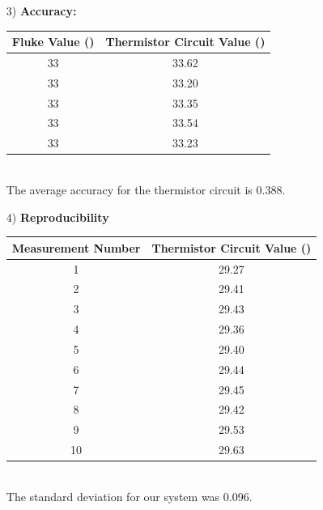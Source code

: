 \documentclass{article}
\begin{document}
\begin{enumerate}
		\item[3)] %
			\textbf{Accuracy: }\\[-2.5ex]
			\begin{table}[h]
				\centering
				\begin{tabular}{|c|c|}\hline
					Fluke Value (\celsius)	&	Thermistor Circuit Value (\celsius)\\ \hline
					33	&	33.62\\ \hline
					33	&	33.20\\ \hline
					33	&	33.35\\ \hline
					33	&	33.54\\ \hline
					33	&	33.23\\ \hline
				\end{tabular}
			\end{table} \\[-1ex]
			The average accuracy for the thermistor circuit is 0.388\celsius.
			
		\item[4)]
			\textbf{Reproducibility}\\[-1ex] %
			\begin{table}[h]
				\centering
				\begin{tabular}{|c|c|}\hline
					Measurement Number	&	Thermistor Circuit Value (\celsius)\\ \hline
					1	&	29.27\\ \hline
					2	&	29.41\\ \hline
					3	&	29.43\\ \hline
					4	&	29.36\\ \hline
					5	&	29.40\\ \hline
					6	&	29.44\\ \hline
					7	&	29.45\\ \hline
					8	&	29.42\\ \hline
					9	&	29.53\\ \hline
					10	&	29.63\\ \hline
				\end{tabular}
			\end{table} \\[-1ex]
			The standard deviation for our system was 0.096\celsius.
	\end{enumerate}
\end{document}
